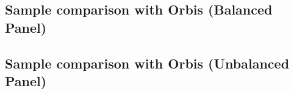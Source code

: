 \documentclass[12pt,notitlepage]{article}
\begin{document}
\subsection{Sample comparison with Orbis (Balanced Panel)}

\begin{table}[!htpb]
    \centering
    \caption{Italy}
    \label{tab:my_label}
\end{table}

\begin{table}[!htpb]
    \centering
    \caption{France}
    \label{tab:my_label}
\end{table}

\begin{table}[!htpb]
    \centering
    \caption{Hungary}
    \label{tab:my_label}
\end{table}

\begin{table}[!htpb]
    \centering
    \caption{Czech Republic}
    \label{tab:my_label}
\end{table}
\pagebreak


\subsection{Sample comparison with Orbis (Unbalanced Panel)}

\begin{table}[!htpb]
    \centering
    \caption{Italy}
    \label{tab:my_label}
\end{table}
\end{document}

